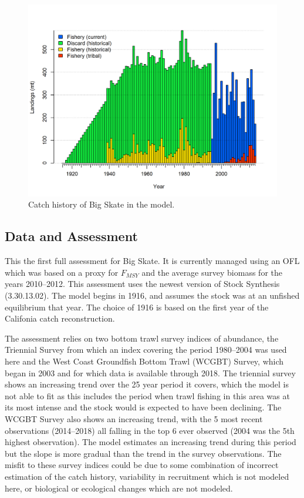 \documentclass[12pt,]{article}
\begin{document}
\FloatBarrier

\begin{figure}
\centering
\includegraphics{r4ss/plots_mod1/catch2 landings stacked.png}
\caption{Catch history of Big Skate in the model.
\label{fig:r4ss_catches}}
\end{figure}

\FloatBarrier

\newpage

\hypertarget{data-and-assessment}{%
\subsection*{Data and Assessment}\label{data-and-assessment}}

This the first full assessment for Big Skate. It is currently managed
using an OFL which was based on a proxy for \(F_{MSY}\) and the average
survey biomass for the years 2010--2012. This assessment uses the newest
version of Stock Synthesis (3.30.13.02). The model begins in 1916, and
assumes the stock was at an unfished equilibrium that year. The choice
of 1916 is based on the first year of the Califonia catch
reconstruction.

The assessment relies on two bottom trawl survey indices of abundance,
the Triennial Survey from which an index covering the period 1980--2004
was used here and the West Coast Groundfish Bottom Trawl (WCGBT) Survey,
which began in 2003 and for which data is available through 2018. The
triennial survey shows an increasing trend over the 25 year period it
covers, which the model is not able to fit as this includes the period
when trawl fishing in this area was at its most intense and the stock
would is expected to have been declining. The WCGBT Survey also shows an
increasing trend, with the 5 most recent observations (2014--2018) all
falling in the top 6 ever observed (2004 was the 5th highest
observation). The model estimates an increasing trend during this period
but the slope is more gradual than the trend in the survey observations.
The misfit to these survey indices could be due to some combination of
incorrect estimation of the catch history, variability in recruitment
which is not modeled here, or biological or ecological changes which are
not modeled.
\end{document}
